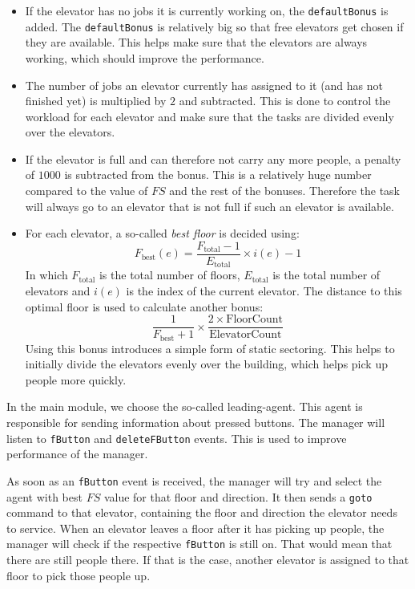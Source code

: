 \documentclass[a4paper,10pt,twocolumn]{article}
\begin{document}
\begin{itemize}
 \item If the elevator has no jobs it is currently working on, the \texttt{defaultBonus} is added. The \texttt{defaultBonus} is relatively big so that free elevators get chosen if they are available. This helps make sure that the elevators are always working, which should improve the performance.
 
 \item The number of jobs an elevator currently has assigned to it (and has not finished yet) is multiplied by $2$ and subtracted. This is done to control the workload for each elevator and make sure that the tasks are divided evenly over the elevators.
 
 \item If the elevator is full and can therefore not carry any more people, a penalty of $1000$ is subtracted from the bonus. This is a relatively huge number compared to the value of $FS$ and the rest of the bonuses. Therefore the task will always go to an elevator that is not full if such an elevator is available.
 
 \item For each elevator, a so-called \emph{best floor} is decided using:
 \begin{equation}
  \label{eq:best_floor}
  F_\text{best} (e) = \frac{F_\text{total} - 1}{E_\text{total}} \times i(e) - 1
 \end{equation}
 In which $F_\text{total}$ is the total number of floors, $E_\text{total}$ is the total number of elevators and $i(e)$ is the index of the current elevator.
 The distance to this optimal floor is used to calculate another bonus:
 \begin{equation}
  \frac{1}{F_\text{best} + 1} \times \frac{2 \times \text{FloorCount}}{\text{ElevatorCount}}
 \end{equation}
 Using this bonus introduces a simple form of static sectoring. This helps to initially divide the elevators evenly over the building, which helps pick up people more quickly.
\end{itemize}

In the main module, we choose the so-called leading-agent. This agent is responsible for sending information about pressed buttons. The manager will listen to \texttt{fButton} and \texttt{deleteFButton} events. This is used to improve performance of the manager. 

As soon as an \texttt{fButton} event is received, the manager will try and select the agent with best $FS$ value for that floor and direction. It then sends a \texttt{goto} command to that elevator, containing the floor and direction the elevator needs to service. When an elevator leaves a floor after it has picking up people, the manager will check if the respective \texttt{fButton} is still on. That would mean that there are still people there. If that is the case, another elevator is assigned to that floor to pick those people up.
\end{document}
